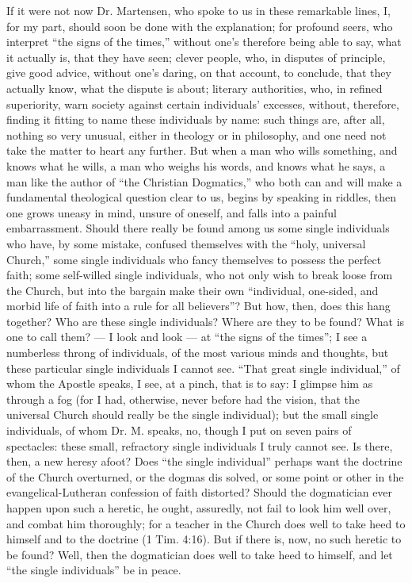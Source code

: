 \documentclass[12pt]{book}
\begin{document}
If it were not now Dr. Martensen, who spoke to us in these remarkable lines, I, for my part, should soon be done with the explanation; for profound seers, who interpret ``the signs of the times,'' without one's therefore being able to say, what it actually is, that they have seen; clever people, who, in disputes of principle, give good advice, without one's daring, on that account, to conclude, that they actually know, what the dispute is about; literary authorities, who, in refined superiority, warn society against certain individuals' excesses, without, therefore, finding it fitting to name these individuals by name: such things are, after all, nothing so very unusual, either in theology or in philosophy, and one
need not take the matter to heart any further. But when a man who wills something, and knows what he wills, a man who weighs his words, and knows what he says, a man like the author of ``the Christian Dogmatics,'' who both can and will make a fundamental theological question clear to us, begins by speaking in riddles, then one grows uneasy in mind, unsure of oneself, and falls into a painful embarrassment. Should there really be found among us some single individuals who have, by some mistake, confused themselves with the ``holy, universal Church,'' some single individuals who fancy themselves to possess the perfect faith; some self-willed single individuals, who not only wish to break loose from the Church, but into the bargain make their own ``individual, one-sided, and morbid life of faith into a rule for all believers''? But how, then, does this hang together? Who are these single individuals? Where are they to be found? What is one to call them? --- I look and look --- at ``the signs of the times''; I see a numberless throng of individuals, of the most various minds and thoughts, but these particular single individuals I cannot see. ``That great single individual,'' of whom the Apostle speaks, I see, at a pinch, that is to say: I glimpse him as through a fog (for I had, otherwise, never before had the vision, that the universal Church should really be the single individual); but the small single individuals, of whom Dr. M. speaks, no, though I put on seven pairs of spectacles: these small, refractory single individuals I truly cannot see. Is there, then, a new heresy afoot? Does ``the single individual'' perhaps want the doctrine of the Church overturned, or the dogmas dis\-%
solved, or some point or other in the evangelical-Lutheran confession of faith distorted? Should the dogmatician ever happen upon such a heretic, he ought, assuredly, not fail to look him well over, and combat him thoroughly; for a teacher in the Church does well to take heed to himself and to the doctrine (1 Tim. 4:16). But if there is, now, no such heretic to be found? Well, then the dogmatician does well to take heed to himself, and let ``the single individuals'' be in peace.
\end{document}
